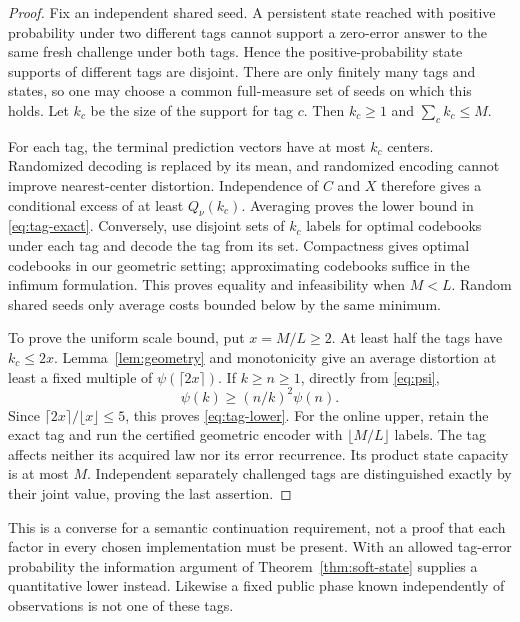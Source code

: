 \begin{proof}
Fix an independent shared seed. A persistent state reached with positive probability under two different tags cannot support a zero-error answer to the same fresh challenge under both tags. Hence the positive-probability state supports of different tags are disjoint. There are only finitely many tags and states, so one may choose a common full-measure set of seeds on which this holds. Let $k_c$ be the size of the support for tag $c$. Then $k_c\ge1$ and $\sum_c k_c\le M$.

For each tag, the terminal prediction vectors have at most $k_c$ centers. Randomized decoding is replaced by its mean, and randomized encoding cannot improve nearest-center distortion. Independence of $C$ and $X$ therefore gives a conditional excess of at least $Q_\nu(k_c)$. Averaging proves the lower bound in \eqref{eq:tag-exact}. Conversely, use disjoint sets of $k_c$ labels for optimal codebooks under each tag and decode the tag from its set. Compactness gives optimal codebooks in our geometric setting; approximating codebooks suffice in the infimum formulation. This proves equality and infeasibility when $M<L$. Random shared seeds only average costs bounded below by the same minimum.

To prove the uniform scale bound, put $x=M/L\ge2$. At least half the tags have $k_c\le2x$. Lemma~\ref{lem:geometry} and monotonicity give an average distortion at least a fixed multiple of $\psi(\lceil2x\rceil)$. If $k\ge n\ge1$, directly from \eqref{eq:psi},
\[
 \psi(k)\ge(n/k)^2\psi(n).
\]
Since $\lceil2x\rceil/\lfloor x\rfloor\le5$, this proves \eqref{eq:tag-lower}. For the online upper, retain the exact tag and run the certified geometric encoder with $\lfloor M/L\rfloor$ labels. The tag affects neither its acquired law nor its error recurrence. Its product state capacity is at most $M$. Independent separately challenged tags are distinguished exactly by their joint value, proving the last assertion.
\end{proof}

This is a converse for a semantic continuation requirement, not a proof that each factor in every chosen implementation must be present. With an allowed tag-error probability the information argument of Theorem~\ref{thm:soft-state} supplies a quantitative lower instead. Likewise a fixed public phase known independently of observations is not one of these tags.

